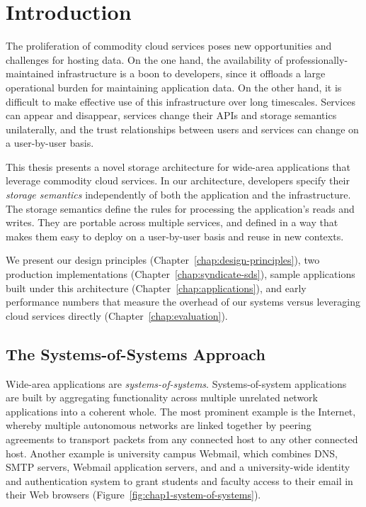 \chapter{Introduction}
\label{chap:introduction}

The proliferation of commodity cloud services poses new opportunities and
challenges for hosting data.  On the one hand, the availability of
professionally-maintained infrastructure is a boon to developers, since it
offloads a large operational burden for maintaining application data.  On the other
hand, it is difficult to make effective use of this infrastructure over long
timescales.  Services can appear and disappear, services change their APIs and
storage semantics unilaterally, and the trust relationships between users and
services can change on a user-by-user basis.

This thesis presents a novel storage architecture for wide-area applications
that leverage commodity cloud services.  In our architecture,
developers specify their \emph{storage semantics} independently of
both the application and the infrastructure.  The storage semantics define the
rules for processing the application's reads and writes.  They are portable
across multiple services, and defined in a way that makes them easy to deploy
on a user-by-user basis and reuse in new contexts.

We present our design principles (Chapter~\ref{chap:design-principles}),
two production implementations (Chapter~\ref{chap:syndicate-sds}), sample
applications built under this architecture (Chapter~\ref{chap:applications}),
and early performance numbers that measure the overhead of our systems versus
leveraging cloud services directly (Chapter~\ref{chap:evaluation}).

\section{The Systems-of-Systems Approach}

Wide-area applications are \emph{systems-of-systems}.  
Systems-of-system applications are built by aggregating
functionality across multiple unrelated network applications into a coherent whole.
The most prominent example is the Internet, whereby multiple autonomous networks
are linked together by peering agreements to transport packets from any
connected host to any other connected host.  Another example is university
campus Webmail, which combines DNS, SMTP servers, Webmail application servers, and 
and a university-wide identity and authentication system to grant students and
faculty access to their email in their Web browsers
(Figure~\ref{fig:chap1-system-of-systems}).

